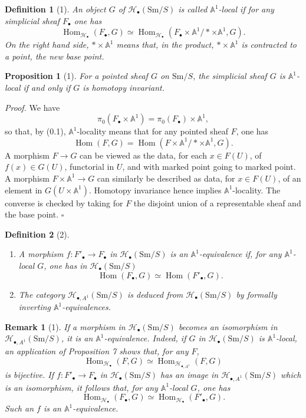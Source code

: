 \documentclass[11pt]{article}
\newcommand{\Aone}{\mathbb A^1}
\newcommand{\Sm}{\mathrm{Sm}}
\newcommand{\Hom}{\operatorname{Hom}}
\newcommand{\Hob}{\mathcal H_\bullet}
\newcommand{\HoA}{\mathcal H_{\bullet,A^1}}
\newcommand{\pt}{*}
\theoremstyle{deligne}
\newtheorem*{proposition*}{Proposition}
\newtheorem*{definition*}{Definition}
\newtheorem*{remark*}{Remark}
\newenvironment{proofdel}{\noindent\textit{Proof.}}{\hfill$\square$}
\begin{document}
\begin{definition*}[1]
An object \(G\) of \(\Hob(\Sm/S)\) is called \(\Aone\)-local if for any simplicial sheaf \(F_\bullet\) one has
\[
  \Hom_{\Hob}(F_\bullet,G)
  \simeq
  \Hom_{\Hob}(F_\bullet\times\Aone/\pt\times\Aone,G).
\]
On the right hand side, \(\pt\times\Aone\) means that, in the product, \(\pt\times\Aone\) is contracted to a point, the new base point.
\end{definition*}

\begin{proposition*}[1]
For a pointed sheaf \(G\) on \(\Sm/S\), the simplicial sheaf \(G\) is \(\Aone\)-local if and only if \(G\) is homotopy invariant.
\end{proposition*}

\begin{proofdel}
We have
\[
  \pi_0(F_\bullet\times\Aone)=\pi_0(F_\bullet)\times\Aone,
\]
so that, by (0.1), \(\Aone\)-locality means that for any pointed sheaf \(F\), one has
\[
  \Hom(F,G)=\Hom(F\times\Aone/\pt\times\Aone,G).
\]
A morphism \(F\to G\) can be viewed as the data, for each \(x\in F(U)\), of \(f(x)\in G(U)\), functorial in \(U\), and with marked point going to marked point. A morphism \(F\times\Aone\to G\) can similarly be described as data, for \(x\in F(U)\), of an element in \(G(U\times\Aone)\). Homotopy invariance hence implies \(\Aone\)-locality. The converse is checked by taking for \(F\) the disjoint union of a representable sheaf and the base point.
\end{proofdel}

\begin{definition*}[2]
\begin{enumerate}[label=(\arabic*)]
\item A morphism \(f:F'_\bullet\to F_\bullet\) in \(\Hob(\Sm/S)\) is an \(\Aone\)-equivalence if, for any \(\Aone\)-local \(G\), one has in \(\Hob(\Sm/S)\)
\[
  \Hom(F_\bullet,G)\simeq \Hom(F'_\bullet,G).
\]
\item The category \(\HoA(\Sm/S)\) is deduced from \(\Hob(\Sm/S)\) by formally inverting \(\Aone\)-equivalences.
\end{enumerate}
\end{definition*}

\begin{remark*}[1]
If a morphism in \(\Hob(\Sm/S)\) becomes an isomorphism in \(\HoA(\Sm/S)\), it is an \(\Aone\)-equivalence. Indeed, if \(G\) in \(\Hob(\Sm/S)\) is \(\Aone\)-local, an application of Proposition 7 shows that, for any \(F\),
\[
  \Hom_{\Hob}(F,G)\simeq \Hom_{\HoA}(F,G)
\]
is bijective. If \(f:F'_\bullet\to F_\bullet\) in \(\Hob(\Sm/S)\) has an image in \(\HoA(\Sm/S)\) which is an isomorphism, it follows that, for any \(\Aone\)-local \(G\), one has
\[
  \Hom_{\Hob}(F_\bullet,G)\simeq \Hom_{\Hob}(F'_\bullet,G).
\]
Such an \(f\) is an \(\Aone\)-equivalence.
\end{remark*}
\end{document}
